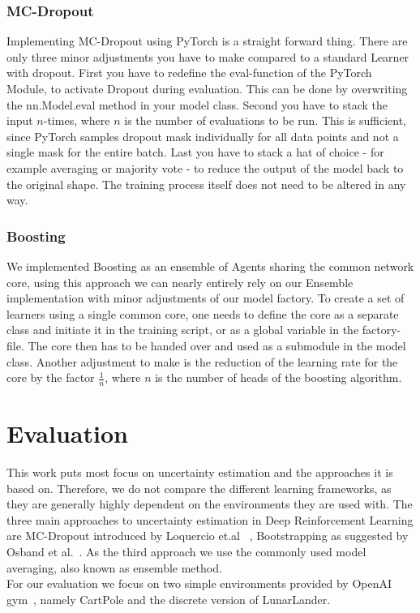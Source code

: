 \documentclass[11pt,a4paper]{article}
\begin{document}
	\subsubsection{MC-Dropout}
	Implementing MC-Dropout using PyTorch is a straight forward thing.
	There are only three minor adjustments you have to make compared to a standard Learner with dropout.
	First you have to redefine the eval-function of the PyTorch Module, to activate Dropout during evaluation.
	This can be done by overwriting the nn.Model.eval method in your model class.
	Second you have to stack the input $n$-times, where $n$ is the number of evaluations to be run.
	This is sufficient, since PyTorch samples dropout mask individually for all data points and not a single mask for the entire batch.
	Last you have to stack a hat of choice - for example averaging or majority vote - to reduce the output of the model back to the original shape.
	The training process itself does not need to be altered in any way.\\

	\subsubsection{Boosting}
	We implemented Boosting as an ensemble of Agents sharing the common network core, using this approach we can nearly entirely rely on our Ensemble implementation with minor adjustments of our model factory.
	To create a set of learners using a single common core, one needs to define the core as a separate class and initiate it in the training script, or as a global variable in the factory-file.
	The core then has to be handed over and used as a submodule in the model class.
	Another adjustment to make is the reduction of the learning rate for the core by the factor $\frac{1}{n}$, where $n$ is the number of heads of the boosting algorithm.


	\section{Evaluation}\label{sec:evaluation}
	This work puts most focus on uncertainty estimation and the approaches it is based on.
	Therefore, we do not compare the different learning frameworks, as they are generally highly dependent on the environments they are used with.
	The three main approaches to uncertainty estimation in Deep Reinforcement Learning are MC-Dropout introduced by Loquercio et.al ~\cite{loquercio_general_2020}, Bootstrapping as suggested by Osband et al.~\cite{osband_deep_2016}.
	As the third approach we use the commonly used model averaging, also known as ensemble method.\\
	For our evaluation we focus on two simple environments provided by OpenAI gym~\cite{openai_gym_nodate}, namely CartPole and the discrete version of LunarLander.\\
\end{document}
